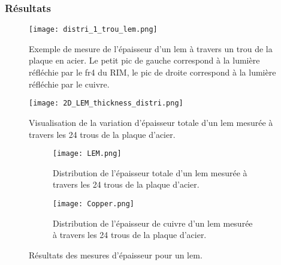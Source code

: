       \subsubsection{Résultats}\label{sec::thickness_result}
         
        \begin{figure}[htpb]
          \centering
          \texttt{[image: distri\_1\_trou\_lem.png]}
          \caption[Exemple de mesure de l'épaisseur d'un LEM.]{\label{fig::distri_1_trou_lem}Exemple de mesure de l'épaisseur d'un \gls{lem} à travers un trou de la plaque en acier. Le petit pic de gauche correspond à la lumière réfléchie par le \gls{fr4} du RIM, le pic de droite correspond à la lumière réfléchie par le cuivre.}
        \end{figure}
        \begin{figure}[htpb]
          \centering
          \texttt{[image: 2D\_LEM\_thickness\_distri.png]}
          \caption[Visualisation de la variation d'épaisseur d'un \gls{lem}.]{\label{fig::distri_24_trou_lem_2D}Visualisation de la variation d'épaisseur totale d'un \gls{lem} mesurée à travers les 24 trous de la plaque d'acier.}
        \end{figure}
          
        \begin{figure}[htpb]
          \begin{subfigure}[b]{0.48\textwidth}
            \texttt{[image: LEM.png]}
            \caption{\label{fig::distri_24_trou_lem_1D}Distribution de l'épaisseur totale d'un \gls{lem} mesurée à travers les 24 trous de la plaque d'acier.}
          \end{subfigure}
          \hfill
          \begin{subfigure}[b]{0.48\textwidth}
            \texttt{[image: Copper.png]}
            \caption{\label{fig::distri_24_trou_cuivre_1D}Distribution de l'épaisseur de cuivre d'un \gls{lem} mesurée à travers les 24 trous de la plaque d'acier.}
          \end{subfigure}
          \caption[Résultats des mesures d'épaisseur pour un \gls{lem}.]{\label{fig::distri_epaisseur_1_lem}Résultats des mesures d'épaisseur pour un \gls{lem}.}
        \end{figure}
                
